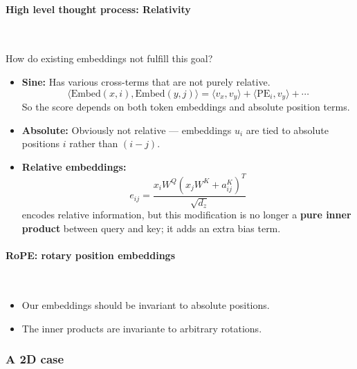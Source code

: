 \paragraph{High level thought process: Relativity }~{}
\\

How do existing embeddings not fulfill this goal?

\begin{itemize}
  \item \textbf{Sine:} Has various cross-terms that are not purely relative. 
  \[
    \langle \mathrm{Embed}(x,i), \mathrm{Embed}(y,j) \rangle 
      = \langle v_x, v_y \rangle 
      + \langle \mathrm{PE}_i, v_y \rangle + \cdots
  \]
  So the score depends on both token embeddings and absolute position terms.

  \item \textbf{Absolute:} Obviously not relative --- embeddings $u_i$ are tied to absolute positions $i$ rather than $(i-j)$.

  \item \textbf{Relative embeddings:} 
  \[
    e_{ij} = \frac{x_i W^Q (x_j W^K + a_{ij}^K)^T}{\sqrt{d_z}}
  \]
  encodes relative information, but this modification is no longer a \textbf{pure inner product} between query and key; it adds an extra bias term. 
\end{itemize}

\paragraph{RoPE: rotary position embeddings}~{}
{
\begin{itemize}
  \item Our embeddings should be invariant to absolute positions.
  \item The inner products are invariante to arbitrary rotations.
\end{itemize}
}

\subsubsection*{A 2D case}

